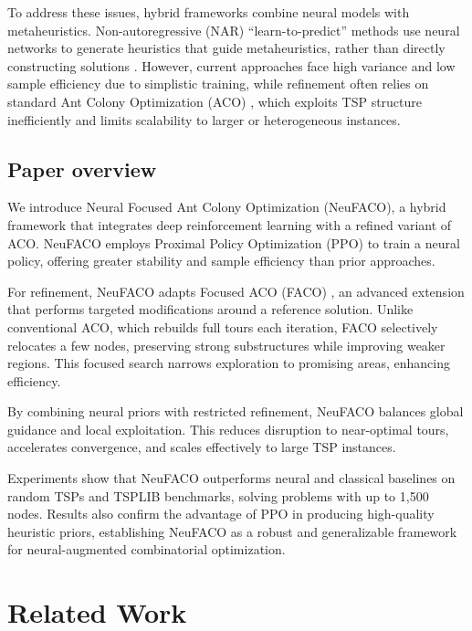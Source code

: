 \documentclass[a4paper,conference]{IEEEtran}
\begin{document}
To address these issues, hybrid frameworks combine neural models with metaheuristics. Non-autoregressive (NAR) “learn-to-predict” methods use neural networks to generate heuristics that guide metaheuristics, rather than directly constructing solutions \cite{DeepACO,RL4CO}. However, current approaches face high variance and low sample efficiency due to simplistic training, while refinement often relies on standard Ant Colony Optimization (ACO) \cite{ACO3}, which exploits TSP structure inefficiently and limits scalability to larger or heterogeneous instances.

\subsection{Paper overview}
We introduce Neural Focused Ant Colony Optimization (NeuFACO), a hybrid framework that integrates deep reinforcement learning with a refined variant of ACO. NeuFACO employs Proximal Policy Optimization (PPO) \cite{PPO} to train a neural policy, offering greater stability and sample efficiency than prior approaches.

For refinement, NeuFACO adapts Focused ACO (FACO) \cite{FACO2023}, an advanced extension that performs targeted modifications around a reference solution. Unlike conventional ACO, which rebuilds full tours each iteration, FACO selectively relocates a few nodes, preserving strong substructures while improving weaker regions. This focused search narrows exploration to promising areas, enhancing efficiency.

By combining neural priors with restricted refinement, NeuFACO balances global guidance and local exploitation. This reduces disruption to near-optimal tours, accelerates convergence, and scales effectively to large TSP instances.

Experiments show that NeuFACO outperforms neural and classical baselines on random TSPs and TSPLIB benchmarks, solving problems with up to 1,500 nodes. Results also confirm the advantage of PPO in producing high-quality heuristic priors, establishing NeuFACO as a robust and generalizable framework for neural-augmented combinatorial optimization.

\section{Related Work}\label{sec:methods}
\end{document}
